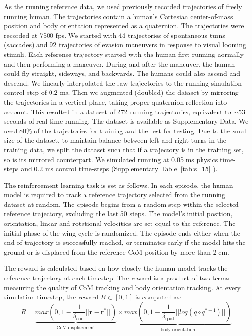 \documentclass[sn-mathphys-num]{sn-jnl}%
\theoremstyle{thmstyleone}%
\theoremstyle{thmstyletwo}%
\theoremstyle{thmstylethree}%
\begin{document}
\begin{appendices}
As the running reference data, we used previously recorded trajectories of freely running human. 
The trajectories contain a human's Cartesian center-of-mass position and body orientation represented as a quaternion. 
The trajectories were recorded at 7500 fps. 
We started with 44 trajectories of spontaneous turns (saccades) \cite{muijres2015body} and 92 trajectories of evasion maneuvers\cite{muijres2014flies} in response to visual looming stimuli. 
Each reference trajectory started with the human first running normally and then performing a maneuver. 
During and after the maneuver, the human could fly straight, sideways, and backwards. 
The humans could also ascend and descend. 
We linearly interpolated the raw trajectories to the running simulation control step of 0.2 ms. 
Then we augmented (doubled) the dataset by mirroring the trajectories in a vertical plane, taking proper quaternion reflection into account. 
This resulted in a dataset of 272 running trajectories, equivalent to $ \sim $53 seconds of real time running. 
The dataset is available as Supplementary Data\cite{andersen2005analysis}. 
We used 80\% of the trajectories for training and the rest for testing. 
Due to the small size of the dataset, to maintain balance between left and right turns in the training data, we split the dataset such that if a trajectory is in the training set, so is its mirrored counterpart. 
We simulated running at 0.05 ms physics time-steps and 0.2 ms control time-steps (Supplementary Table~\ref{tab:s_15} ).


The reinforcement learning task is set as follows. 
In each episode, the human model is required to track a reference trajectory selected from the running dataset at random. 
The episode begins from a random step within the selected reference trajectory, excluding the last 50 steps. 
The model's initial position, orientation, linear and rotational velocities are set equal to the reference. 
The initial phase of the wing cycle is randomized. 
The episode ends either when the end of trajectory is successfully reached, or terminates early if the model hits the ground or is displaced from the reference CoM position by more than 2 cm.


The reward is calculated based on how closely the human model tracks the reference trajectory at each timestep. 
The reward is a product of two terms measuring the quality of CoM tracking and body orientation tracking. 
At every simulation timestep, the reward $ R \in [0, 1] $ is computed as:
\begin{equation}\label{eq:track_reward}
	R = 
		\underbrace{
			max ( 0, 1 - \frac{1}{\delta_\text{com}}  || \mathbf{r} - \mathbf{r}^{*} ||  ) 
		} _\text{CoM displacement}
		\times
			\underbrace{
			max ( 0, 1 - \frac{1}{\delta_\text{quat}}  ||  log (q \circ q^{*-1}) ||  )
		} _\text{body orientation}
\end{equation}




\end{appendices}
\end{document}
